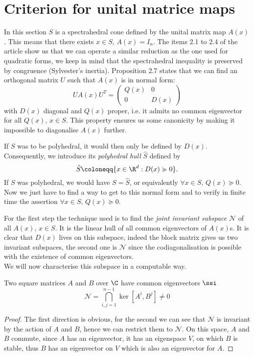 \documentclass[english, mathematiques, theoremes, diagrammes, dessin, a4paper, margin = 2cm]{article-perso}
\begin{document}
\section{Criterion for unital matrice maps}

In this section $S$ is a spectrahedral cone defined by the unital matrix map $A(x)$. This means that there exists $x \in S, \, A(x) = I_n$.
The items 2.1 to 2.4 of the article show us that we can operate a similar reduction as the one used for quadratic forms, we keep in mind that the spectrahedral inequality is preserved by congruence (Sylvester's inertia). Proposition 2.7 states that we can find an orthogonal matrix $U$ such that $A(x)$ is in normal form:
\[UA(x)U^T  = \left(\begin{matrix}
	Q(x)	&	0	\\
	0	&	D(x)
\end{matrix}\right)\]
with $D(x)$ diagonal and $Q(x)$ proper, i.e. it admits no common eigenvector for all $Q(x), \, x \in S$. This property ensures us some canonicity by making it impossible to diagonalise $A(x)$ further.

If $S$ was to be polyhedral, it would then only be defined by $D(x)$. Consequently, we introduce its \emph{polyhedral hull} $\hat{S}$ defined by
\[\hat{S} \coloneqq \{x \in \R^d : D(x) \succcurlyeq 0\}.\]
If $S$ was polyhedral, we would have $S = \hat{S}$, or equivalently $\forall x \in S, \, Q(x) \succcurlyeq 0$. Now we just have to find a way to get to this normal form and to verify in finite time the assertion $\forall x \in S, \, Q(x) \succcurlyeq 0$.

For the first step the technique used is to find the \emph{joint invariant subspace} $\mathcal{N}$ of all $A(x), \, x \in S$. It is the linear hull of all common eigenvectors of $A(x)$s. It is clear that $D(x)$ lives on this subspace, indeed the block matrix gives us two invariant subspaces, the second one is $\mathcal{N}$ since the codiagonalisation is possible with the existence of common eigenvectors.\\
We will now characterise this subspace in a computable way.
\begin{theorem}
	Two square matrices $A$ and $B$ over $\C$ have common eigenvectors $\ssi$
	\[\mathcal{N} = \bigcap_{i,j = 1}^{n-1} \ker [A^i, B^j] \neq 0\]
\end{theorem}

\begin{proof}
	The first direction is obvious, for the second we can see that $\mathcal{N}$ is invariant by the action of $A$ and $B$, hence we can restrict them to $\mathcal{N}$. On this space, $A$ and $B$ commute, since $A$ has an eigenvector, it has an eigenspace $V$, on which $B$ is stable, thus $B$ has an eigenvector on $V$ which is also an eigenvector for $A$.
\end{proof}
\end{document}

